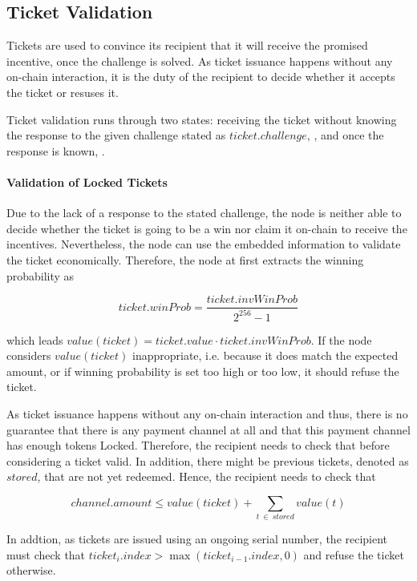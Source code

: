 \subsection{Ticket Validation}
\label{sec:tickets:validation}

Tickets are used to convince its recipient that it will receive the promised incentive, once the challenge is solved. As ticket issuance happens without any on-chain interaction, it is the duty of the recipient to decide whether it accepts the ticket or resuses it.

Ticket validation runs through two states: receiving the ticket without knowing the response to the given challenge stated as $ticket.challenge$, , and once the response is known, .

\paragraph{Validation of Locked Tickets}
\label{sec:tickets:validation:locked}

Due to the lack of a response to the stated challenge, the node is neither able to decide whether the ticket is going to be a win nor claim it on-chain to receive the incentives. Nevertheless, the node can use the embedded information to validate the ticket economically. Therefore, the node at first extracts the winning probability as

$$ticket.winProb = \frac{ticket.invWinProb}{2^{256} - 1} $$

which leads $ value(ticket) = ticket.value \cdot ticket.invWinProb $. If the node considers $value(ticket)$ inappropriate, i.e. because it does match the expected amount, or if winning probability is set too high or too low, it should refuse the ticket.

As ticket issuance happens without any on-chain interaction and thus, there is no guarantee that there is any payment channel at all and that this payment channel has enough tokens Locked. Therefore, the recipient needs to check that before considering a ticket valid. In addition, there might be previous tickets, denoted as $stored$, that are not yet redeemed. Hence, the recipient needs to check that

$$ channel.amount \le value(ticket) + \sum_{t \ \in \ stored} value(t)$$

In addtion, as tickets are issued using an ongoing serial number, the recipient must check that $ticket_i.index > \max(ticket_{i-1}.index,0)$ and refuse the ticket otherwise.

